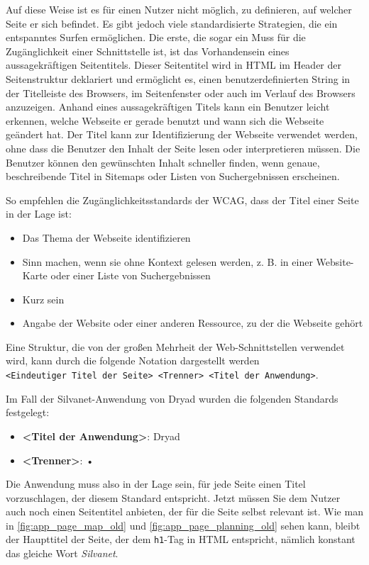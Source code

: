 Auf diese Weise ist es für einen Nutzer nicht möglich, zu definieren, auf welcher Seite er sich befindet.
Es gibt jedoch viele standardisierte Strategien, die ein entspanntes Surfen ermöglichen.
Die erste, die sogar ein Muss für die Zugänglichkeit einer Schnittstelle ist, ist das Vorhandensein eines aussagekräftigen Seitentitels.
Dieser Seitentitel wird in \ac{HTML} im Header der Seitenstruktur deklariert und ermöglicht es, einen benutzerdefinierten String in der Titelleiste des Browsers, im Seitenfenster oder auch im Verlauf des Browsers anzuzeigen.
Anhand eines aussagekräftigen Titels kann ein Benutzer leicht erkennen, welche Webseite er gerade benutzt und wann sich die Webseite geändert hat.
Der Titel kann zur Identifizierung der Webseite verwendet werden, ohne dass die Benutzer den Inhalt der Seite lesen oder interpretieren müssen.
Die Benutzer können den gewünschten Inhalt schneller finden, wenn genaue, beschreibende Titel in Sitemaps oder Listen von Suchergebnissen erscheinen.

So empfehlen die Zugänglichkeitsstandards der \ac{WCAG}\cite{wcag}, dass der Titel einer Seite in der Lage ist:

\begin{itemize}
  \item Das Thema der Webseite identifizieren
  \item Sinn machen, wenn sie ohne Kontext gelesen werden, z. B. in einer Website-Karte oder einer Liste von Suchergebnissen
  \item Kurz sein
  \item Angabe der Website oder einer anderen Ressource, zu der die Webseite gehört
\end{itemize}

Eine Struktur, die von der großen Mehrheit der Web-Schnittstellen verwendet wird, kann durch die folgende Notation dargestellt werden\\
\lstinline{<Eindeutiger Titel der Seite> <Trenner> <Titel der Anwendung>}.

Im Fall der Silvanet-Anwendung von Dryad wurden die folgenden Standards festgelegt:

\begin{itemize}
  \item \textbf{<Titel der Anwendung>}: Dryad
  \item \textbf{<Trenner>}: •
\end{itemize}

Die Anwendung muss also in der Lage sein, für jede Seite einen Titel vorzuschlagen, der diesem Standard entspricht.
Jetzt müssen Sie dem Nutzer auch noch einen Seitentitel anbieten, der für die Seite selbst relevant ist.
Wie man in \ref{fig:app_page_map_old} und \ref{fig:app_page_planning_old} sehen kann, bleibt der Haupttitel der Seite, der dem \lstinline{h1}-Tag in \ac{HTML} entspricht, nämlich konstant das gleiche Wort \textit{Silvanet}.

